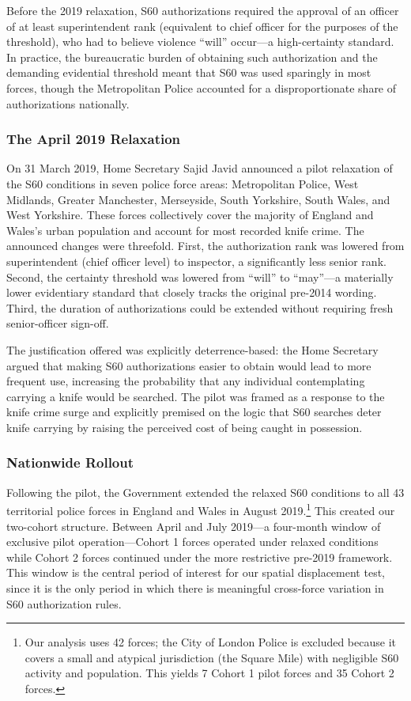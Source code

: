 \documentclass[12pt]{article}
\begin{document}
Before the 2019 relaxation, S60 authorizations required the approval of an officer of at least superintendent rank (equivalent to chief officer for the purposes of the threshold), who had to believe violence ``will'' occur---a high-certainty standard. In practice, the bureaucratic burden of obtaining such authorization and the demanding evidential threshold meant that S60 was used sparingly in most forces, though the Metropolitan Police accounted for a disproportionate share of authorizations nationally.

\subsubsection*{The April 2019 Relaxation}

On 31 March 2019, Home Secretary Sajid Javid announced a pilot relaxation of the S60 conditions in seven police force areas: Metropolitan Police, West Midlands, Greater Manchester, Merseyside, South Yorkshire, South Wales, and West Yorkshire. These forces collectively cover the majority of England and Wales's urban population and account for most recorded knife crime. The announced changes were threefold. First, the authorization rank was lowered from superintendent (chief officer level) to inspector, a significantly less senior rank. Second, the certainty threshold was lowered from ``will'' to ``may''---a materially lower evidentiary standard that closely tracks the original pre-2014 wording. Third, the duration of authorizations could be extended without requiring fresh senior-officer sign-off.

The justification offered was explicitly deterrence-based: the Home Secretary argued that making S60 authorizations easier to obtain would lead to more frequent use, increasing the probability that any individual contemplating carrying a knife would be searched. The pilot was framed as a response to the knife crime surge and explicitly premised on the logic that S60 searches deter knife carrying by raising the perceived cost of being caught in possession.

\subsubsection*{Nationwide Rollout}

Following the pilot, the Government extended the relaxed S60 conditions to all 43 territorial police forces in England and Wales in August 2019.\footnote{Our analysis uses 42 forces; the City of London Police is excluded because it covers a small and atypical jurisdiction (the Square Mile) with negligible S60 activity and population. This yields 7 Cohort 1 pilot forces and 35 Cohort 2 forces.} This created our two-cohort structure. Between April and July 2019---a four-month window of exclusive pilot operation---Cohort 1 forces operated under relaxed conditions while Cohort 2 forces continued under the more restrictive pre-2019 framework. This window is the central period of interest for our spatial displacement test, since it is the only period in which there is meaningful cross-force variation in S60 authorization rules.
\end{document}
